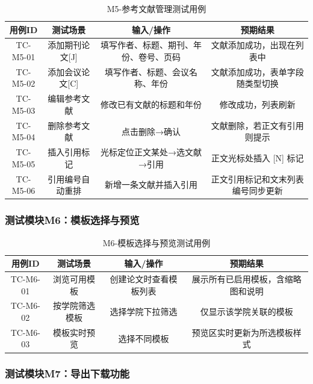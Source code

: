 \begin{table}[htbp]
    \centering
    \caption{M5-参考文献管理测试用例}
    \begin{tabular}{|c|c|c|c|}
        \hline
        \textbf{用例ID} & \textbf{测试场景} & \textbf{输入/操作} & \textbf{预期结果} \\
        \hline
        TC-M5-01 & 添加期刊论文[J] & 填写作者、标题、期刊、年份、卷号、页码 & 文献添加成功，出现在列表中 \\
        \hline
        TC-M5-02 & 添加会议论文[C] & 填写作者、标题、会议名称、年份 & 文献添加成功，表单字段随类型切换 \\
        \hline
        TC-M5-03 & 编辑参考文献 & 修改已有文献的标题和年份 & 修改成功，列表刷新 \\
        \hline
        TC-M5-04 & 删除参考文献 & 点击删除→确认 & 文献删除，若正文有引用则提示 \\
        \hline
        TC-M5-05 & 插入引用标记 & 光标定位正文某处→选文献→引用 & 正文光标处插入 [N] 标记 \\
        \hline
        TC-M5-06 & 引用编号自动重排 & 新增一条文献并插入引用 & 正文引用标记和文末列表编号同步更新 \\
        \hline
    \end{tabular}
\end{table}

\subsubsection{测试模块M6：模板选择与预览}

\begin{table}[htbp]
    \centering
    \caption{M6-模板选择与预览测试用例}
    \begin{tabular}{|c|c|c|c|}
        \hline
        \textbf{用例ID} & \textbf{测试场景} & \textbf{输入/操作} & \textbf{预期结果} \\
        \hline
        TC-M6-01 & 浏览可用模板 & 创建论文时查看模板列表 & 展示所有已启用模板，含缩略图和说明 \\
        \hline
        TC-M6-02 & 按学院筛选模板 & 选择学院下拉筛选 & 仅显示该学院关联的模板 \\
        \hline
        TC-M6-03 & 模板实时预览 & 选择不同模板 & 预览区实时更新为所选模板样式 \\
        \hline
    \end{tabular}
\end{table}

\subsubsection{测试模块M7：导出下载功能}

